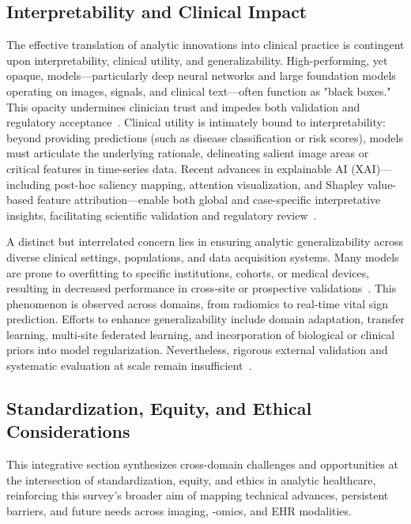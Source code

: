 \documentclass[sigconf]{acmart}
\begin{document}
\subsection{Interpretability and Clinical Impact}

The effective translation of analytic innovations into clinical practice is contingent upon interpretability, clinical utility, and generalizability. High-performing, yet opaque, models—particularly deep neural networks and large foundation models operating on images, signals, and clinical text—often function as "black boxes." This opacity undermines clinician trust and impedes both validation and regulatory acceptance~\cite{ref11, ref32, ref36, ref39, ref46, ref50, ref53, ref54, ref65, ref68, ref70, ref72, ref73, ref78, ref80, ref87, ref90, ref98, ref99, ref106}. Clinical utility is intimately bound to interpretability: beyond providing predictions (such as disease classification or risk scores), models must articulate the underlying rationale, delineating salient image areas or critical features in time-series data. Recent advances in explainable AI (XAI)—including post-hoc saliency mapping, attention visualization, and Shapley value-based feature attribution—enable both global and case-specific interpretative insights, facilitating scientific validation and regulatory review~\cite{ref11, ref36, ref54, ref72, ref78, ref80, ref98, ref99}.

A distinct but interrelated concern lies in ensuring analytic generalizability across diverse clinical settings, populations, and data acquisition systems. Many models are prone to overfitting to specific institutions, cohorts, or medical devices, resulting in decreased performance in cross-site or prospective validations~\cite{ref28, ref32, ref53, ref65, ref73, ref98, ref106}. This phenomenon is observed across domains, from radiomics to real-time vital sign prediction. Efforts to enhance generalizability include domain adaptation, transfer learning, multi-site federated learning, and incorporation of biological or clinical priors into model regularization. Nevertheless, rigorous external validation and systematic evaluation at scale remain insufficient~\cite{ref28, ref70, ref73, ref78, ref80, ref98, ref99, ref106}.

\subsection{Standardization, Equity, and Ethical Considerations}

This integrative section synthesizes cross-domain challenges and opportunities at the intersection of standardization, equity, and ethics in analytic healthcare, reinforcing this survey's broader aim of mapping technical advances, persistent barriers, and future needs across imaging, -omics, and EHR modalities.
\end{document}
